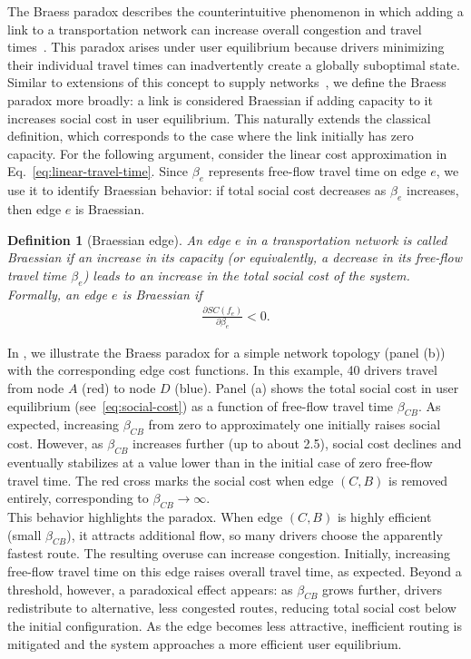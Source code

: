 \documentclass[twocolumn,english,groupedaddress, superscriptaddress,aps,pre,10pt,floatfix]{revtex4-2}
\newtheorem{definition}{Definition}[section]
\begin{document}
The Braess paradox describes the counterintuitive phenomenon in which adding a link to a transportation network can increase overall congestion and travel times~\cite{braess1968paradoxon}. This paradox arises under user equilibrium because drivers minimizing their individual travel times can inadvertently create a globally suboptimal state. Similar to extensions of this concept to supply networks~\citep{schafer2022understanding, manik2022predicting}, we define the Braess paradox more broadly: a link is considered Braessian if adding capacity to it increases social cost in user equilibrium.
This naturally extends the classical definition, which corresponds to the case where the link initially has zero capacity.
For the following argument, consider the linear cost approximation in Eq.~\ref{eq:linear-travel-time}. Since $\beta_e$ represents free-flow travel time on edge $e$, we use it to identify Braessian behavior: if total social cost decreases as $\beta_e$ increases, then edge $e$ is Braessian.

\begin{definition}[Braessian edge]
An edge $e$ in a transportation network is called \emph{Braessian} if an increase in its capacity (or equivalently, a decrease in its free-flow travel time $\beta_e$) leads to an increase in the total social cost of the system. Formally, an edge $e$ is Braessian if
\begin{align}
    \frac{\partial SC(f_e)}{\partial \beta_e} < 0.
\end{align}
\end{definition}

In , we illustrate the Braess paradox for a simple network topology (panel (b)) with the corresponding edge cost functions. In this example, 40 drivers travel from node $A$ (red) to node $D$ (blue). Panel (a) shows the total social cost in user equilibrium (see~\cref{eq:social-cost}) as a function of free-flow travel time $\beta_{CB}$. As expected, increasing $\beta_{CB}$ from zero to approximately one initially raises social cost. However, as $\beta_{CB}$ increases further (up to about 2.5), social cost declines and eventually stabilizes at a value lower than in the initial case of zero free-flow travel time. The red cross marks the social cost when edge $(C,B)$ is removed entirely, corresponding to $\beta_{CB} \rightarrow \infty$.\\

This behavior highlights the paradox. When edge $(C,B)$ is highly efficient (small $\beta_{CB}$), it attracts additional flow, so many drivers choose the apparently fastest route. The resulting overuse can increase congestion. Initially, increasing free-flow travel time on this edge raises overall travel time, as expected. Beyond a threshold, however, a paradoxical effect appears: as $\beta_{CB}$ grows further, drivers redistribute to alternative, less congested routes, reducing total social cost below the initial configuration. As the edge becomes less attractive, inefficient routing is mitigated and the system approaches a more efficient user equilibrium.
\end{document}

